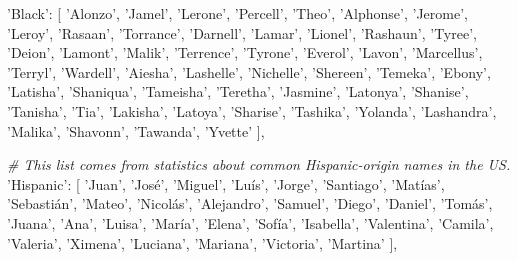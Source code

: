 \documentclass[]{book}
\newenvironment{Shaded}{\begin{snugshade}}{\end{snugshade}}
\newcommand{\StringTok}[1]{\textcolor[rgb]{0.31,0.60,0.02}{#1}}
\newcommand{\CommentTok}[1]{\textcolor[rgb]{0.56,0.35,0.01}{\textit{#1}}}
\newcommand{\NormalTok}[1]{#1}
\theoremstyle{definition}
\theoremstyle{definition}
\theoremstyle{definition}
\theoremstyle{remark}
\begin{document}
\begin{Shaded}
\begin{Highlighting}[]
    \StringTok{'Black'}\NormalTok{: [}
        \StringTok{'Alonzo'}\NormalTok{, }\StringTok{'Jamel'}\NormalTok{, }\StringTok{'Lerone'}\NormalTok{, }\StringTok{'Percell'}\NormalTok{, }\StringTok{'Theo'}\NormalTok{, }\StringTok{'Alphonse'}\NormalTok{, }\StringTok{'Jerome'}\NormalTok{,}
        \StringTok{'Leroy'}\NormalTok{, }\StringTok{'Rasaan'}\NormalTok{, }\StringTok{'Torrance'}\NormalTok{, }\StringTok{'Darnell'}\NormalTok{, }\StringTok{'Lamar'}\NormalTok{, }\StringTok{'Lionel'}\NormalTok{, }\StringTok{'Rashaun'}\NormalTok{,}
        \StringTok{'Tyree'}\NormalTok{, }\StringTok{'Deion'}\NormalTok{, }\StringTok{'Lamont'}\NormalTok{, }\StringTok{'Malik'}\NormalTok{, }\StringTok{'Terrence'}\NormalTok{, }\StringTok{'Tyrone'}\NormalTok{, }\StringTok{'Everol'}\NormalTok{,}
        \StringTok{'Lavon'}\NormalTok{, }\StringTok{'Marcellus'}\NormalTok{, }\StringTok{'Terryl'}\NormalTok{, }\StringTok{'Wardell'}\NormalTok{, }\StringTok{'Aiesha'}\NormalTok{, }\StringTok{'Lashelle'}\NormalTok{, }\StringTok{'Nichelle'}\NormalTok{,}
        \StringTok{'Shereen'}\NormalTok{, }\StringTok{'Temeka'}\NormalTok{, }\StringTok{'Ebony'}\NormalTok{, }\StringTok{'Latisha'}\NormalTok{, }\StringTok{'Shaniqua'}\NormalTok{, }\StringTok{'Tameisha'}\NormalTok{, }\StringTok{'Teretha'}\NormalTok{,}
        \StringTok{'Jasmine'}\NormalTok{, }\StringTok{'Latonya'}\NormalTok{, }\StringTok{'Shanise'}\NormalTok{, }\StringTok{'Tanisha'}\NormalTok{, }\StringTok{'Tia'}\NormalTok{, }\StringTok{'Lakisha'}\NormalTok{, }\StringTok{'Latoya'}\NormalTok{,}
        \StringTok{'Sharise'}\NormalTok{, }\StringTok{'Tashika'}\NormalTok{, }\StringTok{'Yolanda'}\NormalTok{, }\StringTok{'Lashandra'}\NormalTok{, }\StringTok{'Malika'}\NormalTok{, }\StringTok{'Shavonn'}\NormalTok{,}
        \StringTok{'Tawanda'}\NormalTok{, }\StringTok{'Yvette'}
\NormalTok{    ],}
    
    \CommentTok{# This list comes from statistics about common Hispanic-origin names in the US.}
    \StringTok{'Hispanic'}\NormalTok{: [}
        \StringTok{'Juan'}\NormalTok{, }\StringTok{'José'}\NormalTok{, }\StringTok{'Miguel'}\NormalTok{, }\StringTok{'Luís'}\NormalTok{, }\StringTok{'Jorge'}\NormalTok{, }\StringTok{'Santiago'}\NormalTok{, }\StringTok{'Matías'}\NormalTok{, }\StringTok{'Sebastián'}\NormalTok{,}
        \StringTok{'Mateo'}\NormalTok{, }\StringTok{'Nicolás'}\NormalTok{, }\StringTok{'Alejandro'}\NormalTok{, }\StringTok{'Samuel'}\NormalTok{, }\StringTok{'Diego'}\NormalTok{, }\StringTok{'Daniel'}\NormalTok{, }\StringTok{'Tomás'}\NormalTok{,}
        \StringTok{'Juana'}\NormalTok{, }\StringTok{'Ana'}\NormalTok{, }\StringTok{'Luisa'}\NormalTok{, }\StringTok{'María'}\NormalTok{, }\StringTok{'Elena'}\NormalTok{, }\StringTok{'Sofía'}\NormalTok{, }\StringTok{'Isabella'}\NormalTok{, }\StringTok{'Valentina'}\NormalTok{,}
        \StringTok{'Camila'}\NormalTok{, }\StringTok{'Valeria'}\NormalTok{, }\StringTok{'Ximena'}\NormalTok{, }\StringTok{'Luciana'}\NormalTok{, }\StringTok{'Mariana'}\NormalTok{, }\StringTok{'Victoria'}\NormalTok{, }\StringTok{'Martina'}
\NormalTok{    ],}
    

\end{Highlighting}
\end{Shaded}
\end{document}
